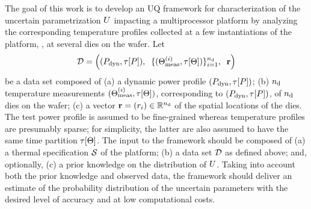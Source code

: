 The goal of this work is to develop an UQ framework for characterization of the uncertain parametrization $U$ impacting a multiprocessor platform by analyzing the corresponding temperature profiles collected at a few instantiations of the platform, \eg, at several dies on the wafer. Let
\[
  \mathcal{D} = \left( (P_{\text{dyn}}, \tau[P]), \; \; \{ (\Theta^{(i)}_{\text{meas}}, \tau[\Theta]) \}_{i = 1}^{{n_\text{d}}}, \; \; \mathbf{r} \right)
\]
be a data set composed of (a) a dynamic power profile $(P_{\text{dyn}}, \tau[P])$; (b) ${n_\text{d}}$ temperature measurements $(\Theta^{(i)}_{\text{meas}}, \tau[\Theta])$, corresponding to $(P_{\text{dyn}}, \tau[P])$, of ${n_\text{d}}$ dies on the wafer; (c) a vector $\mathbf{r} = (r_i) \in \mathbb{R}^{n_\text{d}}$ of the spatial locations of the dies. The test power profile is assumed to be fine-grained whereas temperature profiles are presumably sparse; for simplicity, the latter are also assumed to have the same time partition $\tau[\Theta]$. The input to the framework should be composed of (a) a thermal specification $\mathcal{S}$ of the platform; (b) a data set $\mathcal{D}$ as defined above; and, optionally, (c) a prior knowledge on the distribution of $U$. Taking into account both the prior knowledge and observed data, the framework should deliver an estimate of the probability distribution of the uncertain parameters with the desired level of accuracy and at low computational costs.

